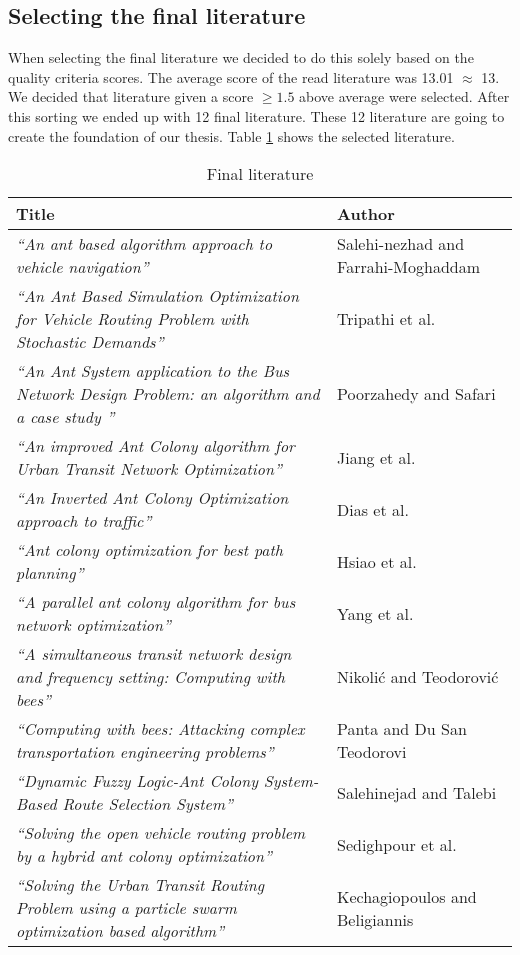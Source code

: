 \subsection{Selecting the final literature}
When selecting the final literature we decided to do this solely based on the quality criteria scores. The average score of the read literature was 13.01 $\approx$ 13. We decided that literature given a score $\geq{1.5}$ above average were selected. After this sorting we ended up with 12 final literature. These 12 literature are going to create the foundation of our thesis. Table \ref{table:finalliterature} shows the selected literature. 

\begin{table}[!htb]
    {
    \begin{center}
    \begin{tabular}[c]{| m{6cm} | m{6cm} |}
        \hline
        \textbf{Title} & \textbf{Author} \\ \hline
        \textit{``An ant based algorithm approach to vehicle navigation''} & Salehi-nezhad and Farrahi-Moghaddam \\ \hline
        \textit{``An Ant Based Simulation Optimization for Vehicle Routing Problem with Stochastic Demands''} & Tripathi et al. \\ \hline
        \textit{``An Ant System application to the Bus Network Design Problem: an algorithm and a case study ''} & Poorzahedy and Safari \\ \hline
        \textit{``An improved Ant Colony algorithm for Urban Transit Network Optimization''} & Jiang et al. \\ \hline
        \textit{``An Inverted Ant Colony Optimization approach to traffic''} & Dias et al. \\ \hline
        \textit{``Ant colony optimization for best path planning''} & Hsiao et al. \\ \hline
        \textit{``A parallel ant colony algorithm for bus network optimization''} & Yang et al. \\ \hline
        \textit{``A simultaneous transit network design and frequency setting: Computing with bees''} & Nikolić and Teodorović \\ \hline
        \textit{``Computing with bees: Attacking complex transportation engineering problems''} & Panta and Du San Teodorovi \\ \hline
        \textit{``Dynamic Fuzzy Logic-Ant Colony System-Based Route Selection System''} & Salehinejad and Talebi \\ \hline
        \textit{``Solving the open vehicle routing problem by a hybrid ant colony optimization''} & Sedighpour et al. \\ \hline
        \textit{``Solving the Urban Transit Routing Problem using a particle swarm optimization based algorithm''} & Kechagiopoulos and Beligiannis \\ 
        \hline
    \end{tabular}
    \end{center}
    } 
\caption{Final literature}\label{table:finalliterature}
\end{table}